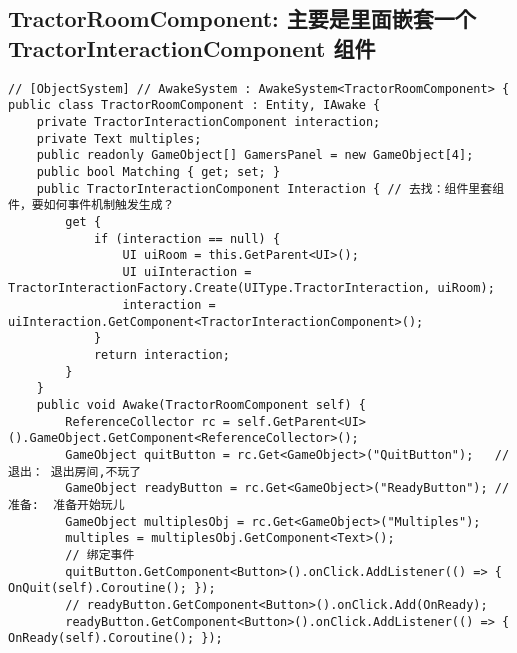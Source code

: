 \documentclass[9pt, b5paper]{article}
\begin{document}
\subsection{TractorRoomComponent: 主要是里面嵌套一个 TractorInteractionComponent 组件}
\label{sec-3-5}
\begin{verbatim}
// [ObjectSystem] // AwakeSystem : AwakeSystem<TractorRoomComponent> {
public class TractorRoomComponent : Entity, IAwake {
    private TractorInteractionComponent interaction;
    private Text multiples;
    public readonly GameObject[] GamersPanel = new GameObject[4];
    public bool Matching { get; set; }
    public TractorInteractionComponent Interaction { // 去找：组件里套组件，要如何事件机制触发生成？
        get {
            if (interaction == null) {
                UI uiRoom = this.GetParent<UI>();
                UI uiInteraction = TractorInteractionFactory.Create(UIType.TractorInteraction, uiRoom);
                interaction = uiInteraction.GetComponent<TractorInteractionComponent>();
            }
            return interaction;
        }
    }
    public void Awake(TractorRoomComponent self) { 
        ReferenceCollector rc = self.GetParent<UI>().GameObject.GetComponent<ReferenceCollector>();
        GameObject quitButton = rc.Get<GameObject>("QuitButton");   // 退出： 退出房间,不玩了
        GameObject readyButton = rc.Get<GameObject>("ReadyButton"); // 准备:  准备开始玩儿
        GameObject multiplesObj = rc.Get<GameObject>("Multiples");
        multiples = multiplesObj.GetComponent<Text>();
        // 绑定事件
        quitButton.GetComponent<Button>().onClick.AddListener(() => { OnQuit(self).Coroutine(); });
        // readyButton.GetComponent<Button>().onClick.Add(OnReady);
        readyButton.GetComponent<Button>().onClick.AddListener(() => { OnReady(self).Coroutine(); });


\end{verbatim}
\end{document}
